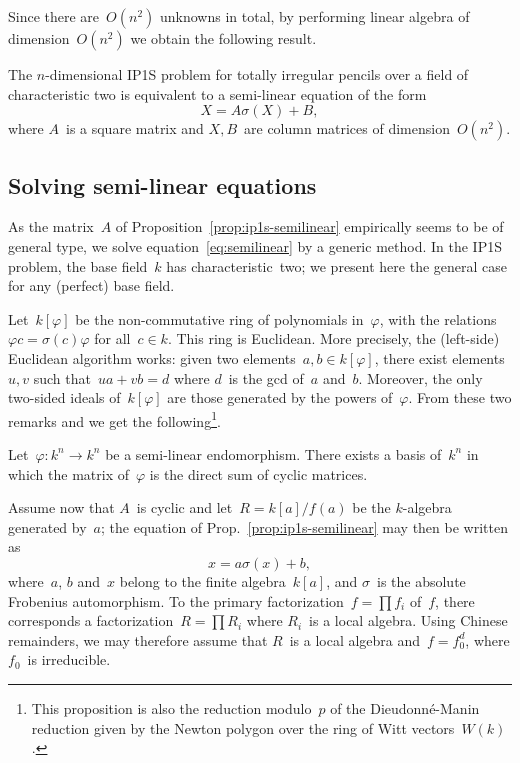 \documentclass{lms}
\begin{document}
Since there are~$O(n^2)$ unknowns in total,
by performing linear algebra of dimension~$O(n^2)$
we obtain the following result.

\begin{prop}\label{prop:ip1s-semilinear}
The $n$-dimensional IP1S problem for totally irregular pencils
over a field of characteristic two is equivalent to
a semi-linear equation of the form
\begin{equation}\label{eq:semilinear}
X = A σ(X) + B,
\end{equation}
where $A$~is a square matrix and $X, B$~are column matrices of
dimension~$O(n^2)$.
\end{prop}

\subsection{Solving semi-linear equations}

As the matrix~$A$ of Proposition~\ref{prop:ip1s-semilinear}
empirically seems to be of general type,
we solve equation~\eqref{eq:semilinear} by a generic method.
In the IP1S problem, the base field~$k$ has characteristic~two; we
present here the general case for any (perfect) base field.

Let~$k[φ]$ be the non-commutative ring of polynomials in~$φ$,
with the relations~$φ c = σ(c) φ$ for all~$c ∈ k$. This ring is Euclidean.
More precisely, the (left-side) Euclidean algorithm works:
given two elements~$a, b ∈ k[φ]$, there exist elements~$u, v$
such that~$u a + v b = d$ where $d$~is the gcd of~$a$ and~$b$.
Moreover, the only two-sided ideals of~$k[φ]$
are those generated by the powers of~$φ$.
From these two remarks and \cite[Ch.~3, Th.~19]{jacobson1943rings} we get
the following\footnote{%
This proposition is also the reduction modulo~$p$ of
the Dieudonné-Manin reduction given by the Newton polygon
over the ring of Witt vectors~$W(k)$.}.
\begin{prop}
Let~$φ: k^n → k^n$ be a semi-linear endomorphism. There exists a basis
of~$k^n$ in which the matrix of~$φ$ is the direct sum of cyclic matrices.
\end{prop}

Assume now that $A$~is cyclic and let~$R = k[a]/f(a)$ be the $k$-algebra
generated by~$a$; the equation of Prop.~\eqref{prop:ip1s-semilinear} may
then be written as
\begin{equation}\label{eq:semi-linear-pol}
x = a σ(x) + b,
\end{equation}
where~$a$, $b$ and~$x$ belong to the finite algebra~$k[a]$, and $σ$~is
the absolute Frobenius automorphism. To the primary factorization~$f = ∏
f_i$ of~$f$, there corresponds a factorization~$R = ∏ R_i$ where $R_i$~is
a local algebra. Using Chinese remainders, we may therefore assume that
$R$~is a local algebra and~$f = f_0^d$, where $f_0$~is irreducible.
\end{document}

